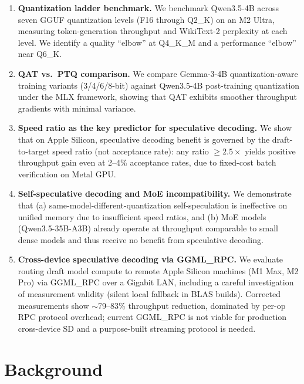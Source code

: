 \documentclass[11pt,a4paper]{article}
\newcommand{\SD}{speculative decoding}
\begin{document}
\begin{enumerate}[leftmargin=*, label=\textbf{\arabic*.}]
  \item \textbf{Quantization ladder benchmark.}
    We benchmark Qwen3.5-4B across seven GGUF quantization levels (F16 through
    Q2\_K) on an M2 Ultra, measuring token-generation throughput and WikiText-2
    perplexity at each level.
    We identify a quality ``elbow'' at Q4\_K\_M and a performance ``elbow'' near
    Q6\_K.

  \item \textbf{QAT vs.\ PTQ comparison.}
    We compare Gemma-3-4B quantization-aware training variants (3/4/6/8-bit)
    against Qwen3.5-4B post-training quantization under the MLX framework,
    showing that QAT exhibits smoother throughput gradients with minimal variance.

  \item \textbf{Speed ratio as the key predictor for speculative decoding.}
    We show that on Apple Silicon, speculative decoding benefit is governed by
    the draft-to-target speed ratio (not acceptance rate): any ratio $\geq 2.5\times$
    yields positive throughput gain even at 2--4\% acceptance rates, due to
    fixed-cost batch verification on Metal GPU.

  \item \textbf{Self-speculative decoding and MoE incompatibility.}
    We demonstrate that (a) same-model-different-quantization self-speculation is
    ineffective on unified memory due to insufficient speed ratios, and
    (b) MoE models (Qwen3.5-35B-A3B) already operate at throughput comparable
    to small dense models and thus receive no benefit from \SD.

  \item \textbf{Cross-device speculative decoding via GGML\_RPC.}
    We evaluate routing draft model compute to remote Apple Silicon machines
    (M1 Max, M2 Pro) via GGML\_RPC over a Gigabit LAN, including a careful
    investigation of measurement validity (silent local fallback in BLAS builds).
    Corrected measurements show $\sim$79--83\% throughput reduction, dominated by
    per-op RPC protocol overhead; current GGML\_RPC is not viable for production
    cross-device SD and a purpose-built streaming protocol is needed.
\end{enumerate}

\section{Background}
\end{document}
